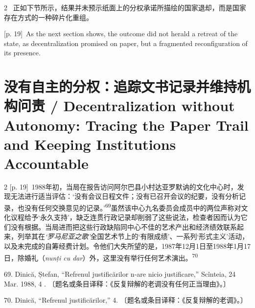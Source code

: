 \documentclass[10pt,a4paper]{article}
\begin{document}
\begin{paracol}{2}
\switchcolumn*
{\scriptsize\color{gray} [p. 19]}\ 正如下节所示，结果并未预示纸面上的分权承诺所描绘的国家退却，而是国家存在方式的一种碎片化重组。\par
\switchcolumn
{\scriptsize\color{gray} [p. 19]}\ As the next section shows, the outcome did not herald a retreat of the state, as decentralization promised on paper, but a fragmented reconfiguration of its presence.\par
\switchcolumn*
\end{paracol}
\section*{没有自主的分权：追踪文书记录并维持机构问责 / Decentralization without Autonomy: Tracing the Paper Trail and Keeping Institutions Accountable}
\begin{paracol}{2}
{\scriptsize\color{gray} [p. 19]}\ 1988年初，当局在报告访问阿尔巴县小村达亚罗默讷的文化中心时，发现无法进行适当评估：‘没有会议日程文件；没有已召开会议的纪要，没有分析记录，也没有任何交换意见的记录。’\nobreak\textsuperscript{69}虽然该中心九名委员会成员中的两位声称对文化议程给予‘永久支持’，缺乏连贯行政记录却削弱了这些说法，检查者因而认为它们没有根据。当局进而把这些行政缺陷同中心不佳的艺术产出和经济绩效联系起来，列举其在\textit{‘罗马尼亚之歌’}全国艺术节上的‘有限成绩’、一系列‘形式主义’活动，以及未完成的自筹经费计划。令他们大失所望的是，1987年12月1日至1988年1月17日，除婚礼（\textit{nunți cu dar}）外，这里没有举行任何艺术演\mbox{出。\textsuperscript{70}}\par{\small 69. Dinică, Ștefan, “Refrenul justificărilor n-are nicio justificare,” Scînteia, 24 Mar. 1988, 4 . 〔题名或条目译释：《反复辩解的老调没有任何正当理由》。〕\par}{\small 70. Dinică, “Refrenul justificărilor,” 4. 〔题名或条目译释：《反复辩解的老调》。〕\par}
\switchcolumn

\end{paracol}
\end{document}

